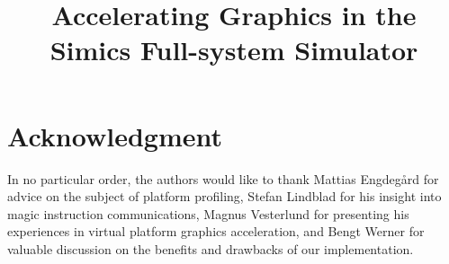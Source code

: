 \documentclass[conference, compsoc]{IEEEtran}
\begin{document}
\title{Accelerating Graphics in the Simics Full-system Simulator}

\author{
  \and
  }

\maketitle








%
\IEEEpeerreviewmaketitle

\section*{Acknowledgment}
In no particular order, the authors would like to thank Mattias Engdeg{\aa}rd for advice on the subject of platform profiling, Stefan Lindblad for his insight into magic instruction communications, Magnus Vesterlund for presenting his experiences in virtual platform graphics acceleration, and Bengt Werner for valuable discussion on the benefits and drawbacks of our implementation.



\end{document}
